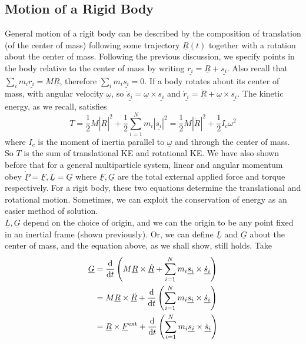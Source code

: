 \subsection{Motion of a Rigid Body}
General motion of a rigit body can be described by the composition of translation (of the center of mass) following some trajectory $\underline{R}(t)$ together with a rotation about the center of mass.
Following the previous discussion, we specify points in the body relative to the center of mass by writing $\underline{r_i}=\underline{R}+\underline{s_i}$.
Also recall that $\sum_im_i\underline{r_i}=M\underline{R}$, therefore $\sum_im_i\underline{s_i}=0$.
If a body rotates about its center of mass, with angular velocity $\underline{\omega}$, so $\underline{\dot{s}_i}=\underline{\omega}\times\underline{s_i}$ and $\underline{\dot{r}_i}=\underline{\dot{R}}+\underline{\omega}\times\underline{s_i}$.
The kinetic energy, as we recall, satisfies
$$T=\frac{1}{2}M|\underline{\dot{R}}|^2+\frac{1}{2}\sum_{i=1}^Nm_i|\underline{s_i}|^2=\frac{1}{2}M|\underline{\dot{R}}|^2+\frac{1}{2}I_c\omega^2$$
where $I_c$ is the moment of inertia parallel to $\underline{\omega}$ and through the center of mass.
So $T$ is the sum of translational KE and rotational KE.
We have also shown before that for a general multiparticle system, linear and angular momentum obey $\underline{\dot{P}}=\underline{F},\underline{\dot{L}}=\underline{G}$ where $\underline{F},\underline{G}$ are the total external applied force and torque respectively.
For a rigit body, these two equations determine the translational and rotational motion.
Sometimes, we can exploit the conservation of energy as an easier method of solution.\\
$\underline{L},\underline{G}$ depend on the choice of origin, and we can the origin to be any point fixed in an inertial frame (shown previously).
Or, we can define $\underline{L}$ and $\underline{G}$ about the center of mass, and the equation above, as we shall show, still holds.
Take
\begin{align*}
    \underline{G}&=\frac{\mathrm d}{\mathrm dt}\left(M\underline{R}\times\underline{\dot{R}}+\sum_{i=1}^Nm_i\underline{s_i}\times\underline{\dot{s}_i}\right)\\
    &=M\underline{R}\times\underline{\ddot{R}}+\frac{\mathrm d}{\mathrm dt}\left( \sum_{i=1}^Nm_i\underline{s_i}\times\underline{\dot{s}_i} \right)\\
    &=\underline{R}\times\underline{F}^{\rm ext}+\frac{\mathrm d}{\mathrm dt}\left( \sum_{i=1}^Nm_i\underline{s_i}\times\underline{\dot{s}_i} \right)
\end{align*}
